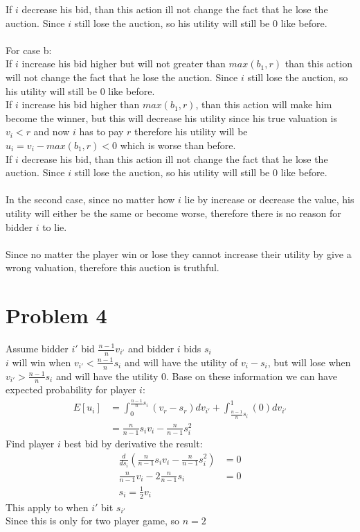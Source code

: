 \documentclass{article}
\begin{document}
If $i$ decrease his bid, than this action ill not change the fact that he lose the auction. Since $i$ still lose the auction, so his utility will still be $0$ like before.\\\\
For case b:\\
If $i$ increase his bid higher but will not greater than $max(b_1,r)$ than this action will not change the fact that he lose the auction. Since $i$ still lose the auction, so his utility will still be $0$ like before.\\
If $i$ increase his bid higher than $max(b_1,r)$, than this action will make him become the winner, but this will decrease his utility since his true valuation is $v_i < r$ and now $i$ has to pay $r$ therefore his utility will be $u_i = v_i - max(b_1,r) < 0$ which is worse than before.\\
If $i$ decrease his bid, than this action ill not change the fact that he lose the auction. Since $i$ still lose the auction, so his utility will still be $0$ like before.\\\\
In the second case, since no matter how $i$ lie by increase or decrease the value, his utility will either be the same or become worse, therefore there is no reason for bidder $i$ to lie.\\\\
Since no matter the player win or lose they cannot increase their utility by give a wrong valuation, therefore this auction is truthful.

\newpage
\section{Problem 4}
Assume bidder $i'$ bid $\frac{n-1}{n}v_{i'}$ and bidder $i$ bids $s_i$\\
$i$ will win when $v_{i'} < \frac{n-1}{n}s_i$ and will have the utility of $v_i - s_i$, but will lose when $v_{i'} >  \frac{n-1}{n}s_i$ and will have the utility $0$.
Base on these information we can have expected probability for player $i$: 
\begin{align*}
E[u_i] &= \int_0^{\frac{n-1}{n}s_i} (v_r - s_r) dv_{i'} + \int_{\frac{n-1}{n}s_i}^1 (0) dv_{i'}\\
&= \frac{n}{n-1}s_iv_i - \frac{n}{n-1}s_i^2
\end{align*}
Find player $i$ best bid by derivative the result:
\begin{align*}
\frac{d}{ds_i}(\frac{n}{n-1}s_iv_i - \frac{n}{n-1}s_i^2) &= 0\\
\frac{n}{n-1}v_i - 2\frac{n}{n-1}s_i &= 0\\
s_i = \frac{1}{2}v_i
\end{align*}
This apply to when $i'$ bit $s_{i'}$\\
Since this is only for two player game, so $n = 2$
\end{document}
